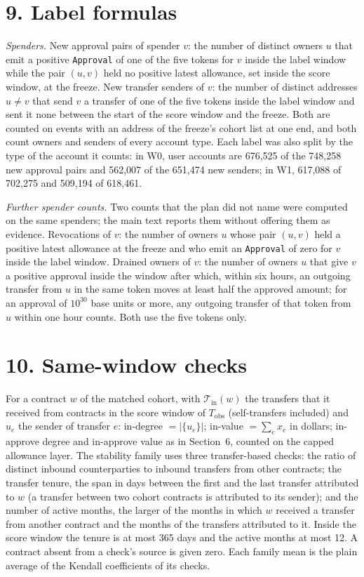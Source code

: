 \documentclass[10pt,letterpaper]{article}
\begin{document}
\section*{9. Label formulas}
\textit{Spenders.} New approval pairs of spender $v$: the number of distinct owners $u$ that emit a positive \texttt{Approval} of one of the five tokens for $v$ inside the label window while the pair $(u,v)$ held no positive latest allowance, set inside the score window, at the freeze. New transfer senders of $v$: the number of distinct addresses $u\neq v$ that send $v$ a transfer of one of the five tokens inside the label window and sent it none between the start of the score window and the freeze. Both are counted on events with an address of the freeze's cohort list at one end, and both count owners and senders of every account type. Each label was also split by the type of the account it counts: in W0, user accounts are 676,525 of the 748,258 new approval pairs and 562,007 of the 651,474 new senders; in W1, 617,088 of 702,275 and 509,194 of 618,461.

\textit{Further spender counts.} Two counts that the plan did not name were computed on the same spenders; the main text reports them without offering them as evidence. Revocations of $v$: the number of owners $u$ whose pair $(u,v)$ held a positive latest allowance at the freeze and who emit an \texttt{Approval} of zero for $v$ inside the label window. Drained owners of $v$: the number of owners $u$ that give $v$ a positive approval inside the window after which, within six hours, an outgoing transfer from $u$ in the same token moves at least half the approved amount; for an approval of $10^{30}$ base units or more, any outgoing transfer of that token from $u$ within one hour counts. Both use the five tokens only.

\section*{10. Same-window checks}
For a contract $w$ of the matched cohort, with $\mathcal{T}_{\mathrm{in}}(w)$ the transfers that it received from contracts in the score window of $T_{\mathrm{obs}}$ (self-transfers included) and $u_e$ the sender of transfer $e$: in-degree $=|\{u_e\}|$; in-value $=\sum_e x_e$ in dollars; in-approve degree and in-approve value as in Section~6, counted on the capped allowance layer. The stability family uses three transfer-based checks: the ratio of distinct inbound counterparties to inbound transfers from other contracts; the transfer tenure, the span in days between the first and the last transfer attributed to $w$ (a transfer between two cohort contracts is attributed to its sender); and the number of active months, the larger of the months in which $w$ received a transfer from another contract and the months of the transfers attributed to it. Inside the score window the tenure is at most 365 days and the active months at most 12. A contract absent from a check's source is given zero. Each family mean is the plain average of the Kendall coefficients of its checks.
\end{document}
